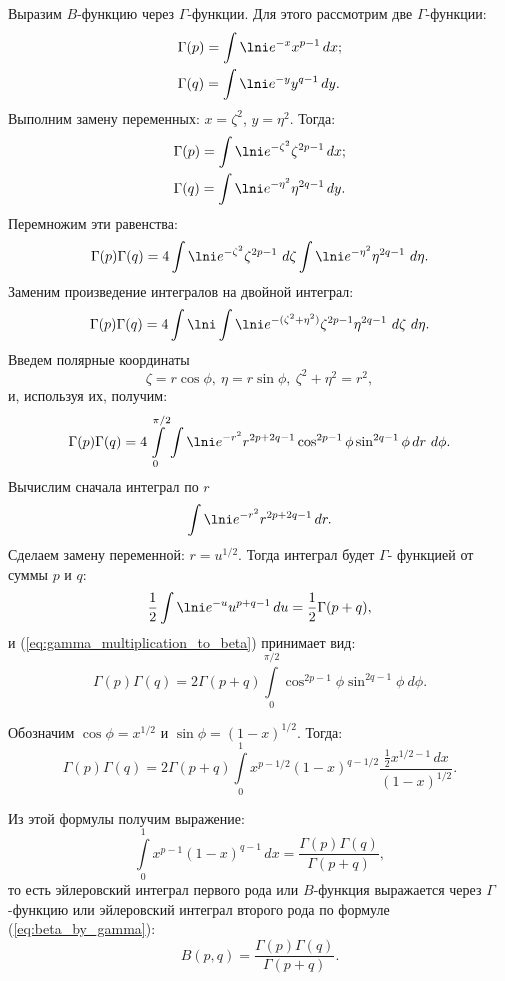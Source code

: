 Выразим \( B \)-функцию через \( \Gamma \)-функции. Для этого рассмотрим две
\( \Gamma \)-функции:
\begin{align*}
    &  \Gamma(p) = \int\lni e^{-x}x^{p-1}\,dx; \\
    &  \Gamma(q) = \int\lni e^{-y}y^{q-1}\,dy.
\end{align*}
Выполним замену переменных: \( x = \zeta^2 \), \( y = \eta^2 \). Тогда:
\begin{align*}
    &  \Gamma(p) = \int\lni e^{-\zeta^2}\zeta^{2p-1}\,dx; \\
    &  \Gamma(q) = \int\lni e^{-\eta^2}\eta^{2q-1}\,dy.
\end{align*}
Перемножим эти равенства:
\[
    \Gamma(p)\Gamma(q) = 4\int\lni e^{-\zeta^2}\zeta^{2p-1}\ d\zeta
    \int\lni e^{-\eta^2}\eta^{2q-1}\ d\eta.
\]
Заменим произведение интегралов на двойной интеграл:
\[
    \Gamma(p)\Gamma(q) = 4\int\lni\int\lni e^{-(\zeta^2 + \eta^2)}
    \zeta^{2p-1}\eta^{2q-1}\ d\zeta\ d\eta.
\]
Введем полярные координаты
\[
    \zeta = r\cos\phi,\ \eta = r\sin\phi,\ \zeta^2 + \eta^2 = r^2,
\]
и, используя их, получим:
\begin{equation}
    \Gamma(p)\Gamma(q) = 4\int\limits_0^{\pi/2}\int\lni e^{-r^2} r^{2p+2q-1}
    \cos^{2p-1}\phi\sin^{2q-1}\phi\,dr\ d\phi.
    \label{eq:gamma_multiplication_to_beta}
\end{equation}
Вычислим сначала интеграл по \( r \)
\[
    \int\lni e^{-r^2}r^{2p+2q-1}\,dr.
\]
Сделаем замену переменной: \( r = u^{1/2} \). Тогда интеграл будет \( \Gamma \)-
функцией от суммы \( p \) и \( q \):
\[
    \frac{1}{2} \int\lni e^{-u}u^{p+q-1}\,du = \frac{1}{2}\Gamma(p + q),
\]
и (\ref{eq:gamma_multiplication_to_beta}) принимает вид:
\[
    \Gamma(p)\Gamma(q) = 2\Gamma(p + q)\int\limits_0^{\pi/2}
    \cos^{2p-1}\phi\sin^{2q-1}\phi\ d\phi.
\]

Обозначим \( \cos\phi = x^{1/2} \) и \( \sin\phi = (1-x)^{1/2} \). Тогда:
\[
    \Gamma(p)\Gamma(q) = 2\Gamma(p + q)\int\limits_0^1 x^{p-1/2} (1-x)^{q-1/2}
    \frac{\frac{1}{2}x^{1/2-1}\,dx}{(1-x)^{1/2}}.
\]

Из этой формулы получим выражение:
\[
    \int\limits_0^1 x^{p-1}(1-x)^{q-1}\,dx =
    \frac{\Gamma(p)\Gamma(q)}{\Gamma(p + q)},
\]
то есть эйлеровский интеграл первого рода или \( B \)-функция выражается через
\( \Gamma \)-функцию или эйлеровский интеграл второго рода по формуле
(\ref{eq:beta_by_gamma}):
\begin{equation}
    B(p, q) = \frac{\Gamma(p)\Gamma(q)}{\Gamma(p + q)}.
    \label{eq:beta_by_gamma}
\end{equation}

